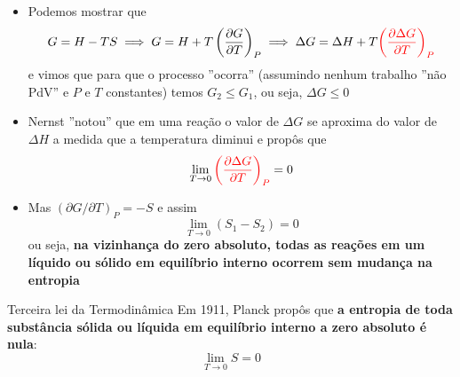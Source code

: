 \documentclass[t,%
brazilian,%
11pt,%
aspectratio=169,%
table%
]{beamer}
\begin{document}



\begin{frame}
    \begin{itemize}
        \item Podemos mostrar que 
            \[
                G=H-TS \implies G=H+T\left(\dfrac{\partial G}{\partial T}\right)_P
                \implies \Delta G = \Delta H + T{\color{red}\left(\frac{\partial \Delta G}{\partial T}\right)_P}
            \]
            e vimos que para que o processo ''ocorra'' (assumindo nenhum trabalho ''não PdV'' e
            \(P\) e \(T\) constantes) temos \(G_2 \leq G_1\), ou seja, \(\Delta G \leq 0\)
        \item Nernst ''notou'' que em uma reação o valor de \(\Delta G\) se aproxima do valor de \(\Delta H\) a medida
            que a temperatura diminui e propôs que
            \[
                \lim_{T \to 0} {\color{red}\left(\frac{\partial \Delta G}{\partial T} \right)_P} = 0
            \]
        \item Mas \(\left(\partial G / \partial T\right)_P =  -S\) e assim
            \[
                \lim_{T \to 0} {(S_1 - S_2)} = 0
            \]
            ou seja, \textbf{na vizinhança do zero absoluto, todas as reações em um líquido ou sólido
            em equilíbrio interno ocorrem sem mudança na entropia}
    \end{itemize}
\end{frame}

\begin{frame}[c]{Terceira lei da Termodinâmica}
     Em 1911, Planck propôs que \textbf{a entropia de toda substância sólida ou líquida em equilíbrio interno a 
     zero absoluto é nula}:
     \[
         \lim_{T\to 0} S = 0
     \]
 \end{frame}
\end{document}
